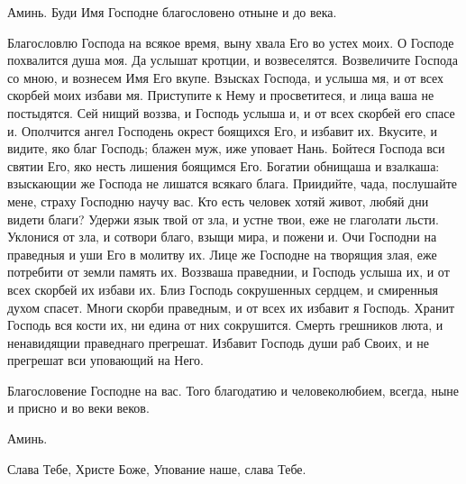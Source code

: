 \begin{mymulticols}
 Аминь. Буди Имя Господне благословено отныне и до века. 



 Благословлю Господа на всякое время, выну хвала Его во устех моих. О Господе похвалится душа моя. Да услышат кротции, и возвеселятся. Возвеличите Господа со мною, и вознесем Имя Его вкупе. Взысках Господа, и услыша мя, и от всех скорбей моих избави мя. Приступите к Нему и просветитеся, и лица ваша не постыдятся. Сей нищий воззва, и Господь услыша и, и от всех скорбей его спасе и. Ополчится ангел Господень окрест боящихся Его, и избавит их. Вкусите, и видите, яко благ Господь; блажен муж, иже уповает Нань. Бойтеся Господа вси святии Его, яко несть лишения боящимся Его. Богатии обнищаша и взалкаша: взыскающии же Господа не лишатся всякаго блага. Приидийте, чада, послушайте мене, страху Господню научу вас. Кто есть человек хотяй живот, любяй дни видети благи? Удержи язык твой от зла, и устне твои, еже не глаголати льсти. Уклонися от зла, и сотвори благо, взыщи мира, и пожени и. Очи Господни на праведныя и уши Его в молитву их. Лице же Господне на творящия злая, еже потребити от земли память их. Воззваша праведнии, и Господь услыша их, и от всех скорбей их избави их. Близ Господь сокрушенных сердцем, и смиренныя духом спасет. Многи скорби праведным, и от всех их избавит я Господь. Хранит Господь вся кости их, ни едина от них сокрушится. Смерть грешников люта, и ненавидящии праведнаго прегрешат. Избавит Господь души раб Своих, и не прегрешат вси уповающий на Него.


 Благословение Господне на вас. Того благодатию и человеколюбием, всегда, ныне и присно и во веки веков.

 Аминь.

 Слава Тебе, Христе Боже, Упование наше, слава Тебе.



\end{mymulticols}
